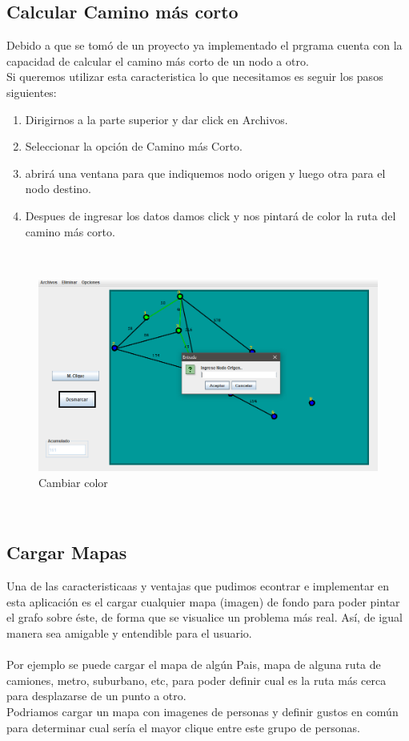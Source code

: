 \subsection{Calcular Camino más corto}
Debido a que se tomó de un proyecto ya implementado el prgrama cuenta con la capacidad de calcular el camino más corto de un nodo a otro. 
\\
Si queremos utilizar esta caracteristica lo que necesitamos es seguir los pasos siguientes: 
\begin{enumerate}
    \item Dirigirnos a la parte superior y dar click en Archivos. 
    \item Seleccionar la opción de Camino más Corto. 
    \item abrirá una ventana para que indiquemos nodo origen y luego otra para el nodo destino. 
    \item Despues de ingresar los datos damos click y nos pintará de color la ruta del camino más corto.
\end{enumerate}
\\
\begin{figure}[h!]
\centering
\includegraphics[scale=.6]{img/corto.PNG}
\caption{Cambiar color}
\label{Comandos}
\end{figure}
\\
\subsection{Cargar Mapas}
Una de las caracteristicaas y ventajas que pudimos econtrar e implementar en esta aplicación es el cargar cualquier mapa (imagen) de fondo para poder pintar el grafo sobre éste, de forma que se visualice un problema más real. Así, de igual manera sea amigable y entendible para el usuario. 
\\\\
Por ejemplo se puede cargar el mapa de algún Pais, mapa de alguna ruta de camiones, metro, suburbano, etc, para poder definir cual es la ruta más cerca para desplazarse de un punto a otro. 
\\
Podriamos cargar un mapa con imagenes de personas y definir gustos en común para determinar cual sería el mayor clique entre este grupo de personas. 
\\

